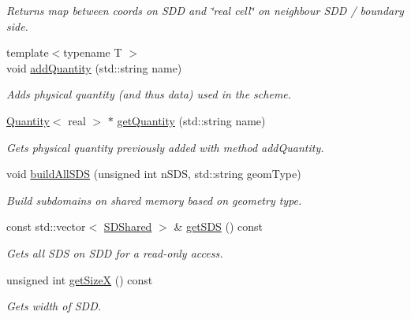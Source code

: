 \begin{DoxyCompactItemize}
\begin{DoxyCompactList}\small\item\em Returns map between coords on SDD and \char`\"{}real cell\char`\"{} on neighbour SDD / boundary side. \item\end{DoxyCompactList}\item 
{\footnotesize template$<$typename T $>$ }\\void \hyperlink{classSDDistributed_a6b21ad5588e9128737406ac417127393}{addQuantity} (std::string name)
\begin{DoxyCompactList}\small\item\em Adds physical quantity (and thus data) used in the scheme. \item\end{DoxyCompactList}\item 
\hyperlink{classQuantity}{Quantity}$<$ real $>$ $\ast$ \hyperlink{classSDDistributed_a14f296606ff1afa1e4878fa6c4928afc}{getQuantity} (std::string name)
\begin{DoxyCompactList}\small\item\em Gets physical quantity previously added with method addQuantity. \item\end{DoxyCompactList}\item 
void \hyperlink{classSDDistributed_a3dbacea02c2d4f36310c81f87f90fe5a}{buildAllSDS} (unsigned int nSDS, std::string geomType)
\begin{DoxyCompactList}\small\item\em Build subdomains on shared memory based on geometry type. \item\end{DoxyCompactList}\item 
const std::vector$<$ \hyperlink{classSDShared}{SDShared} $>$ \& \hyperlink{classSDDistributed_a441ca869ca0246ea980d3d2fba4edb9b}{getSDS} () const 
\begin{DoxyCompactList}\small\item\em Gets all SDS on SDD for a read-\/only access. \item\end{DoxyCompactList}\item 
unsigned int \hyperlink{classSDDistributed_ab4f67f6e409d05a77edc148902d67790}{getSizeX} () const 
\begin{DoxyCompactList}\small\item\em Gets width of SDD. \item\end{DoxyCompactList}\item 

\end{DoxyCompactItemize}

